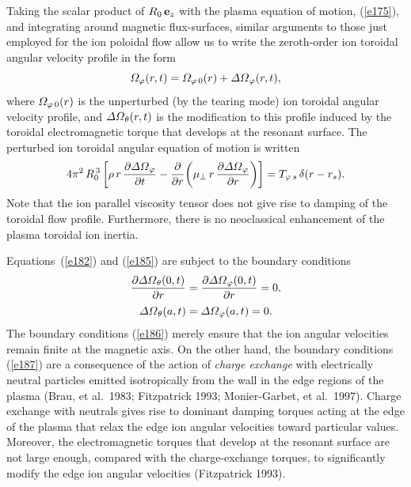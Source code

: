 \documentclass[notitlepage,12pt]{article}
\begin{document}
Taking the scalar product of  $R_0\,{\bf e}_z$ with the plasma equation of motion, (\ref{e175}), and integrating around magnetic
flux-surfaces, similar arguments to those just employed for the ion poloidal flow allow us to write the zeroth-order ion toroidal angular velocity profile in the form
\begin{equation}
{\mit\Omega}_\varphi(r,t)= {\mit\Omega}_{\varphi\,0}(r) + {\mit\Delta\Omega}_\varphi(r,t),
\end{equation}
where ${\mit\Omega}_{\varphi\,0}(r)$ is the 
unperturbed (by the tearing mode) ion toroidal angular velocity profile, and ${\mit\Delta\Omega}_{\theta}(r,t)$ is the  modification to  this  profile
induced by the toroidal electromagnetic torque that develops at the resonant surface. The perturbed ion toroidal angular
equation of motion is written
\begin{equation}\label{e185}
4\pi^2\,R_0^{\,3}\left[\rho\,r\,\frac{\partial {\mit\Delta\Omega}_\varphi}{\partial t}-\frac{\partial}{\partial r}\!\left(\mu_\perp\,r\,\frac{\partial{\mit\Delta\Omega}_\varphi}{\partial r}\right)\right]
=T_{\varphi\,s}\,\delta(r-r_s).
\end{equation}
Note that the ion parallel viscosity tensor does not give rise to damping of the toroidal flow profile. Furthermore, there is  no
neoclassical enhancement of the plasma toroidal ion inertia. 

Equations~(\ref{e182}) and (\ref{e185}) are subject to the boundary conditions
\begin{align}\label{e186}
\frac{\partial{\mit\Delta\Omega}_\theta(0,t)}{\partial r} &= \frac{\partial{\mit\Delta\Omega}_\varphi(0,t)}{\partial r} =0,\\[0.5ex]
{\mit\Delta\Omega}_\theta(a,t) &= {\mit\Delta\Omega}_\varphi(a,t)=0.\label{e187}
\end{align}
The boundary conditions (\ref{e186}) merely ensure that the ion angular velocities remain finite at the magnetic axis. 
On the other  hand, the boundary conditions (\ref{e187}) are a consequence of the action of {\em charge exchange}\/ with electrically neutral particles emitted isotropically from the wall  in the edge regions of the plasma
(Brau, et al.\ 1983; Fitzpatrick 1993; Monier-Garbet, et al.\ 1997). Charge exchange with neutrals gives rise to 
dominant damping torques acting at the edge of the plasma that relax the edge ion angular velocities  toward  particular values. Moreover, the
electromagnetic torques that develop at the resonant surface are not large enough, compared with the charge-exchange torques,
to significantly modify the edge ion angular velocities (Fitzpatrick 1993). 
\end{document}
